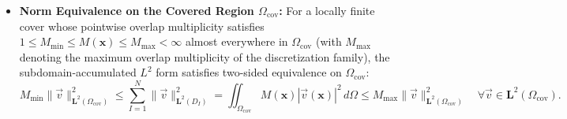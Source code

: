 \documentclass[VANCOUVER]{USG}
\begin{document}
\begin{itemize}
          with $C_1, C_2$ depending only on $\alpha_s, C_A,$ and $C_u$. By the triangle inequality across any overlap $\Omega_s^{IJ} \equiv D_I \cap D_J \ne \emptyset$, the inter-stencil discrepancy is governed locally by $h_{IJ} \equiv \max(h_I, h_J)$. Under the additional \textbf{quasi-uniformity hypothesis} that local spacings and stencil support radii remain comparable to $h_{\mathrm{char}}$ across the refinement family,
          \begin{equation}
              c_0 h_{\mathrm{char}} \le h_I \le r_u^I \le C_0 h_{\mathrm{char}} \qquad \forall I \in \{1, \dots, N\},
              \label{eq:quasi_uniformity_hypothesis}
          \end{equation}
          with refinement-independent constants $0 < c_0 \le C_0 < \infty$ (whereas on non-quasi-uniform clouds with strongly clustered or rarefied regions, $h_{\mathrm{char}}$ below is replaced by the local scale $h_{IJ} = \max(h_I, h_J)$), the overlap jumps scale globally as:
          \begin{align}
              \|\vec{E}_{I,h} - \vec{E}_{J,h}\|_{\boldsymbol{L}^2(\Omega_s^{IJ})} & \le C_3 h_{\mathrm{char}}^2 \|\vec{E}\|_{\boldsymbol{H}^2(\Omega_u^I \cup \Omega_u^J)}, \label{eq:stencil_jump_L2} \\
              \|\operatorname{curl}\vec{E}_{I,h} - \operatorname{curl}\vec{E}_{J,h}\|_{\boldsymbol{L}^2(\Omega_s^{IJ})} & \le C_4 h_{\mathrm{char}} \|\vec{E}\|_{\boldsymbol{H}^2(\Omega_u^I \cup \Omega_u^J)}. \label{eq:stencil_jump_curl}
          \end{align}
    \item \textbf{Norm Equivalence on the Covered Region $\Omega_{\mathrm{cov}}$:} For a locally finite cover whose pointwise overlap multiplicity satisfies $1 \le M_{\min} \le M(\mathbf{x}) \le M_{\max} < \infty$ almost everywhere in $\Omega_{\mathrm{cov}}$ (with $M_{\max}$ denoting the maximum overlap multiplicity of the discretization family), the subdomain-accumulated $L^2$ form satisfies two-sided equivalence on $\Omega_{\mathrm{cov}}$:
          \begin{equation}
              M_{\min} \|\vec{v}\|_{\boldsymbol{L}^2(\Omega_{\mathrm{cov}})}^2 \le \sum_{I=1}^N \|\vec{v}\|_{\boldsymbol{L}^2(D_I)}^2 = \iint_{\Omega_{\mathrm{cov}}} M(\mathbf{x}) |\vec{v}(\mathbf{x})|^2 \, d\Omega \le M_{\max} \|\vec{v}\|_{\boldsymbol{L}^2(\Omega_{\mathrm{cov}})}^2 \quad \forall \vec{v} \in \boldsymbol{L}^2(\Omega_{\mathrm{cov}}).
              \label{eq:norm_equivalence_multiplicity}
          \end{equation}

\end{itemize}
\end{document}

